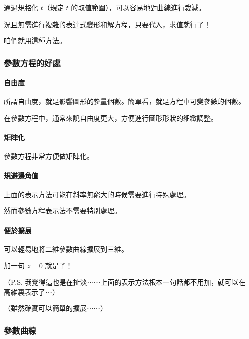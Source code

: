\documentclass[
]{article}
\begin{document}
通過規格化 \(t\)（規定 \(t\) 的取值範圍），可以容易地對曲線進行裁減。

況且無需進行複雜的表達式變形和解方程，只要代入，求值就行了！

咱們就用這種方法。

\hypertarget{header-n138}{%
\subsubsection{參數方程的好處}\label{header-n138}}

\hypertarget{header-n139}{%
\paragraph{自由度}\label{header-n139}}

所謂自由度，就是影響圖形的參量個數。簡單看，就是方程中可變參數的個數。

在參數方程中，通常來說自由度更大，方便進行圖形形狀的細緻調整。

\hypertarget{header-n142}{%
\paragraph{矩陣化}\label{header-n142}}

參數方程非常方便做矩陣化。

\hypertarget{header-n144}{%
\paragraph{規避邊角值}\label{header-n144}}

上面的表示方法可能在斜率無窮大的時候需要進行特殊處理。

然而參數方程表示法不需要特別處理。

\hypertarget{header-n147}{%
\paragraph{便於擴展}\label{header-n147}}

可以輕易地將二維參數曲線擴展到三維。

加一句 \(z = 0\) 就是了！

（P.S.
我覺得這也是在扯淡⋯⋯上面的表示方法根本一句話都不用加，就可以在高維裏表示了⋯）

（雖然確實可以簡單的擴展⋯⋯）

\hypertarget{header-n152}{%
\subsubsection{參數曲線}\label{header-n152}}
\end{document}
